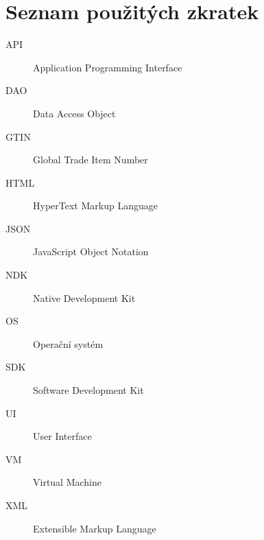 \documentclass[thesis=B,czech]{FITthesis}[2013/10/20]
\begin{document}



\appendix

\chapter{Seznam použitých zkratek}
\begin{description}
	\item[API] Application Programming Interface
	\item[DAO] Data Access Object
	\item[GTIN] Global Trade Item Number
	\item[HTML] HyperText Markup Language
	\item[JSON] JavaScript Object Notation
	\item[NDK] Native Development Kit
	\item[OS] Operační systém
	\item[SDK] Software Development Kit
	\item[UI] User Interface
	\item[VM] Virtual Machine
	\item[XML] Extensible Markup Language
\end{description}
\end{document}

